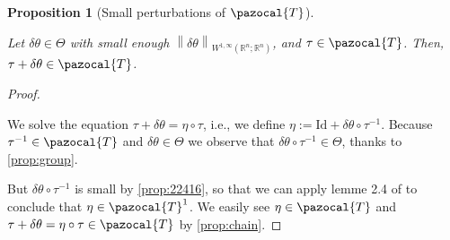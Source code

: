 \documentclass[english,a4paper,10pt,oneside]{scrbook}	%
\theoremstyle{break}
\newtheorem{prop}[equation]{Proposition}
\newenvironment{mproof}[1][\proofname]{%
  \begin{proof}[#1]$ $\par\nobreak\ignorespaces
}{%
  \end{proof}
}
\renewcommand*{\proofname}{Proof}
\theoremstyle{remark}
\newcommand{\mR}{\mathbb{R}}
\newcommand{\norm}[1]{\left\lVert#1\right\rVert}
\newcommand{\cT}{\pazocal{T}}
\newcommand{\id}{\text{Id}}
\newcommand{\te}{\theta}
\newcommand{\Te}{\Theta}
\begin{document}
\begin{appendices}
\begin{prop}[Small perturbations of $\cT$]
\label{prop:ptb_id}

Let $\delta \te \in \Te$ with small enough $\norm{\delta\te}_{W^{1,\infty}(\mR^n;\mR^n)}$, and $\tau \in \cT$. Then, $\tau + \delta \te\in \cT$.

\end{prop}
\begin{mproof}

%
%

%
%


We solve the equation $\tau + \delta \te =\eta \circ \tau$, i.e., we define $\eta:=\id + \delta \te \circ \tau^{-1}$. Because $\tau^{-1} \in \cT$ and $\delta \te \in \Te$ we observe that $\delta \te \circ \tau^{-1} \in \Te $, thanks to \cref{prop:group}.

But $\delta \te \circ \tau^{-1}$ is small by \cref{prop:22416}, so that we can apply lemme 2.4 of \cite{murat} to conclude that $\eta \in \cT^1$. We easily see $\eta \in \cT$ and $\tau + \delta \te = \eta \circ \tau \in \cT$ by \cref{prop:chain}.
\end{mproof}


\end{appendices}
\end{document}

